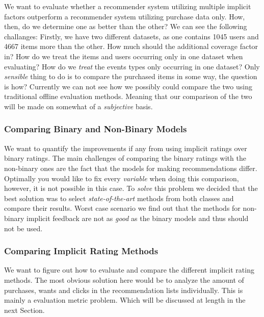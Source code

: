 
We want to evaluate whether a recommender system utilizing multiple implicit factors outperform
a recommender system utilizing purchase data only.
How, then, do we determine one as better than the other? We can see the following challanges:
Firstly, we have two different datasets, as one contains 1045 users and 4667 items more than the
other. How much should the additional coverage factor in? How do we treat the items and users
occurring only in one dataset when evaluating? How do we \emph{treat} the events types only
occurring in one dataset? Only \emph{sensible} thing to do is to compare the purchased items
in some way, the question is how? Currently we can not see how we possibly could compare the
two using traditional offline evaluation methods. Meaning that our comparison of the two will
be made on somewhat of a \emph{subjective} basis.
	
\subsubsection{Comparing Binary and Non-Binary Models}

We want to quantify the improvements if any from using implicit ratings over binary ratings.
The main challenges of comparing the binary ratings with the non-binary ones are the fact
that the models for making recommendations differ. Optimally you would like to fix every
\emph{variable} when doing this comparison, however, it is not possible in this case.
To \emph{solve} this problem we decided that the best solution was to select \emph{state-of-the-art}
methods from both classes and compare their results. Worst case scenario we find out that the
methods for non-binary implicit feedback are not as \emph{good} as the binary models and thus
should not be used.

\subsubsection{Comparing Implicit Rating Methods}

We want to figure out how to evaluate and compare the different implicit rating
methods.  The most obvious solution here would be to analyze the amount of
purchases, wants and clicks in the recommendation lists individually. This is
mainly a evaluation metric problem. Which will be discussed at length in the
next Section.


